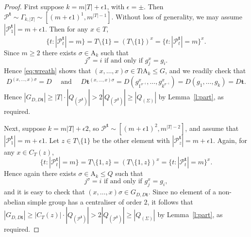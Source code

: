 \documentclass[twoside,a4paper,reqno,11pt]{amsart}
\newcommand{\<}{\langle}
\renewcommand{\>}{\rangle}
\newcommand{\leqs}{\leqslant}
\newcommand{\geqs}{\geqslant}
\def\ge{\geqs}
\def\le{\leqs}
\newcommand{\An}{\mathrm{A}}
\newcommand{\minPart}{\Gamma_{k, |T|}}
\theoremstyle{definition}
\begin{document}
\begin{proof}
    First suppose  $k = m|T| +  \epsilon 1$, with $\epsilon = \pm$. Then $\mathcal{P}^{\mathbf{t}}\sim \minPart \sim [(m + \epsilon 1)^1,m^{|T|-1}]$. Without loss of generality, we may assume $|\mathcal{P}_1^{\mathbf{t}}| = m + \epsilon 1$. Then for any $x\in T$,
	\begin{equation*}
	\{t:|\mathcal{P}_t^{\mathbf{t}}| = m\} = T\setminus\{1\} = (T\setminus\{1\})^{x} = \{t:|\mathcal{P}_t^{\mathbf{t}}| = m\}^{x}.
	\end{equation*}
	Since $m \ge 2$ there exists $\sigma\in \An_k$ such that
	\begin{equation*}
	j^\sigma = i\mbox{ if and only if }g_j^{x} = g_i.
	\end{equation*}
	Hence \eqref{eq:wreath} shows that $(x,\dots,x)\sigma\in T \wr \An_k \leqs G$, and  we readily check that
	\begin{equation*}
	D^{(x, \ldots, x)\sigma} = D \quad \mbox{ and } \quad  D\mathbf{t}^{(x,\dots,x)\sigma} = D(g_{1^{\sigma^{-1}}}^{x},\dots,g_{k^{\sigma^{-1}}}^{x}) = D(g_1,\dots,g_k) = D\mathbf{t}.
	\end{equation*}
	Hence $|G_{D,D\mathbf{t}}| \geqs |T|\cdot |Q_{(\mathcal{P}^{\mathbf{t}})}| > 2|Q_{(\mathcal{P}^{\mathbf{t}})}| \geqs |Q_{(\Sigma)}|$ by Lemma~\ref{l:part}, as required. 
	
	Next, suppose $k = m|T| + \epsilon 2$, so $\mathcal{P}^{\mathbf{t}}\sim [(m + \epsilon 1 )^2,m^{|T|-2}]$, and assume that $|\mathcal{P}_1^{\mathbf{t}}| = m + \epsilon 1$. Let $z\in T\setminus\{1\}$ be the other element with $|\mathcal{P}_z^{\mathbf{t}}| = m + \epsilon 1$. Again, for any $x\in C_T(z)$,
	\begin{equation*}
	\{t:|\mathcal{P}_t^{\mathbf{t}}| = m\} = T\setminus\{1,z\} = (T\setminus\{1,z\})^{x} = \{t:|\mathcal{P}_t^{\mathbf{t}}| = m\}^{x}.
	\end{equation*}
	Hence again there exists $\sigma\in \An_k \le Q$ such that
	\begin{equation*}
	j^\sigma = i\mbox{ if and only if }g_j^{x} = g_i,
	\end{equation*}
	and it is easy to check that $(x,\dots,x)\sigma\in G_{D,D\mathbf{t}}$. Since no element of a non-abelian simple group has a  centraliser of order $2$,  
    it follows that $|G_{D,D\mathbf{t}}|\geqs |C_T(z)|\cdot |Q_{(\mathcal{P}^{\mathbf{t}})}| > 2|Q_{(\mathcal{P}^{\mathbf{t}})}| \geqs |Q_{(\Sigma)}|$ by Lemma~\ref{l:part}, as required.
	

\end{proof}
\end{document}

